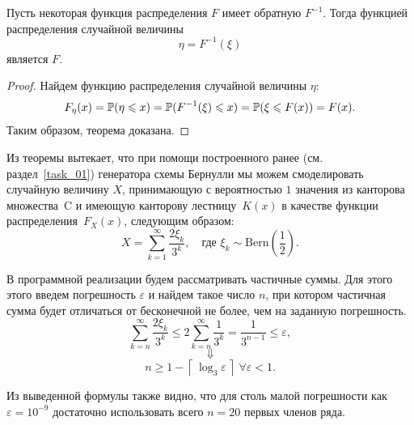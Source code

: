 \begin{theorem}
        Пусть некоторая функция распределения $F$ имеет обратную $F^{-1}$. Тогда функцией распределения случайной величины
        $$
                \eta = F^{-1}(\xi)
        $$
        является $F$.
\end{theorem}
\begin{proof}
        Найдем функцию распределения случайной величины $\eta$:
        $$
                F_\eta(x) =
                \mathbb{P}(\eta \leqslant x) =
                \mathbb{P}(F^{-1}(\xi) \leqslant x) =
                \mathbb{P}(\xi \leqslant F(x)) =
                F(x).
        $$
        Таким образом, теорема доказана.
\end{proof}

Из теоремы вытекает, что при помощи построенного ранее (см. раздел~\ref{task_01}) генератора схемы Бернулли мы можем смоделировать случайную величину $X$, принимающую с вероятностью $1$ значения из канторова множества~C и имеющую канторову лестницу~$K(x)$ в качестве функции распределения~$F_X(x)$, следующим образом:
$$
        X = \sum_{k = 1}^{\infty}\frac{2\xi_k}{3^k},
        \quad
        \mbox{где $\xi_k\sim\mbox{Bern}\left(\frac12\right)$.}
$$

В программной реализации будем рассматривать частичные суммы. Для этого этого введем погрешность $\varepsilon$ и найдем такое число $n$, при котором частичная сумма будет отличаться от бесконечной не более, чем на заданную погрешность.
$$
        \sum_{k=n}^{\infty} \frac{2\xi_k}{3^k} \leqslant 2\sum_{k=n}^{\infty}\frac{1}{3^k} = \frac{1}{3^{n-1}} \leqslant \varepsilon,
$$
$$
        \Downarrow
$$
$$
        n \geqslant 1 - \left\lceil\,\log_3 \varepsilon\,\right\rceil \; \forall \varepsilon < 1.
$$
\begin{remark}
        Из выведенной формулы также видно, что для столь малой погрешности как $\varepsilon = 10^{-9}$ достаточно использовать всего $n = 20$ первых членов ряда.
\end{remark}

